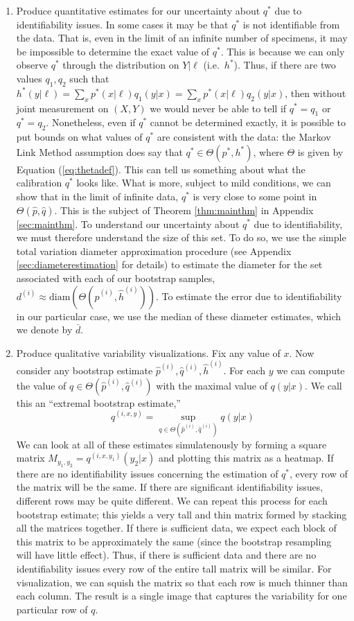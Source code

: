 \begin{enumerate}
\item Produce quantitative estimates for our uncertainty about $q^*$ due to identifiability issues.  In some cases it may be that $q^*$ is not identifiable from the data.  That is, even in the limit of an infinite number of specimens, it may be impossible to determine the exact value of $q^*$.  This is because we can only observe $q^*$ through the distribution on $Y|\ell$ (i.e.\ $h^*$).  Thus, if there are two values $q_1,q_2$ such that $h^*(y|\ell)=\sum_x p^*(x|\ell)q_1(y|x)=\sum_x p^*(x|\ell)q_2(y|x)$, then without joint measurement on $(X,Y)$ we would never be able to tell if $q^*=q_1$ or $q^*=q_2$.  Nonetheless, even if $q^*$ cannot be determined exactly, it is possible to put bounds on what values of $q^*$ are consistent with the data: the Markov Link Method assumption does say that $q^* \in \Theta(p^*,h^*)$, where $\Theta$ is given by Equation (\ref{eq:thetadef}).  This can tell us something about what the calibration $q^*$ looks like.  What is more, subject to mild conditions, we can show that in the limit of infinite data, $q^*$ is very close to some point in $\Theta(\hat p,\hat q)$.  This is the subject of Theorem \ref{thm:mainthm} in Appendix \ref{sec:mainthm}.  To understand our uncertainty about $q^*$ due to identifiability, we must therefore understand the size of this set.  To do so, we use the simple total variation diameter approximation procedure (see Appendix \ref{sec:diameterestimation} for details) to estimate the diameter for the set associated with each of our bootstrap samples, $d^{(i)}\approx \mathrm{diam}(\Theta(\hat p^{(i)},\hat h^{(i)}))$.  To estimate the error due to identifiability in our particular case, we use the median of these diameter estimates, which we denote by $\bar d$.
%
\item Produce qualitative variability visualizations.  Fix any value of $x$.  Now consider any bootstrap estimate $\hat p^{(i)},\hat q^{(i)},\hat h^{(i)}$.  For each $y$ we can compute the value of $q\in \Theta(\hat p^{(i)},\hat q^{(i)})$ with the maximal value of $q(y|x)$.  We call this an ``extremal bootstrap estimate,'' \
\[
q^{(i,x,y)} = \sup_{q\in\Theta(\hat p^{(i)},\hat q^{(i)})} q(y|x)
\]
We can look at all of these estimates simulatenously by forming a square matrix $M_{y_1,y_2} = q^{(i,x,y_1)}(y_2|x)$ and plotting this matrix as a heatmap.  If there are no identifiability issues concerning the estimation of $q^*$, every row of the matrix will be the same.  If there are significant identifiability issues, different rows may be quite different.  We can repeat this process for each bootstrap estimate; this yields a very tall and thin matrix formed by stacking all the matrices together.  If there is sufficient data, we expect each block of this matrix to be approximately the same (since the bootstrap resampling will have little effect).  Thus, if there is sufficient data and there are no identifiability issues every row of the entire tall matrix will be similar.  For visualization, we can squish the matrix so that each row is much thinner than each column.  The result is a single image that captures the variability for one particular row of $q$.  

\end{enumerate}

